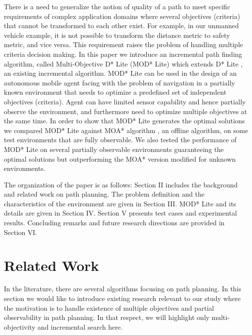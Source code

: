 \documentclass[10pt, a4paper, conference, compsocconf]{IEEEtran}
\begin{document}
There is a need to generalize the notion of quality of a path to meet specific requirements of complex application domains where several objectives (criteria) that cannot be transformed to each other exist. For example, in our unmanned vehicle example, it is not possible to transform the distance metric to safety metric, and vice versa. This requirement raises the problem of handling multiple criteria decision making. In this paper we introduce an incremental path finding algorithm, called Multi-Objective D* Lite (MOD* Lite) which extends D* Lite \cite{Koenig:2002}, an existing incremental algorithm. MOD* Lite can be used in the design of an autonomous mobile agent facing with the problem of navigation in a partially known environment that needs to optimize a predefined set of independent objectives (criteria). Agent can have limited sensor capability and hence partially observe the environment, and furthermore need to optimize multiple objectives at the same time. In order to show that MOD* Lite generates the optimal solutions we compared MOD* Lite against MOA* algorithm \cite{MOAStewart:1991}, an offline algorithm, on some test environments that are fully observable. We also tested the performance of MOD* Lite on several partially observable environments guaranteeing the optimal solutions but outperforming the MOA* version modified for unknown environments. 

The organization of the paper is as follows: Section II includes the background and related work on path planning. The problem definition and the characteristics of the environment are given in Section III. MOD* Lite and its details are given in Section IV. Section V presents test cases and experimental results. Concluding remarks and future research directions are provided in Section VI.

\section{Related Work}
In the literature, there are several algorithms focusing on path planning. In this section we would like to introduce existing research relevant to our study where the motivation is to handle existence of multiple objectives and partial observability in path planning. In that respect, we will highlight only multi-objectivity and incremental search here.
\end{document}
